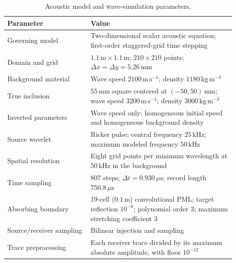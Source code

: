 \documentclass{article}
\begin{document}
\begin{table}[!htbp]
  \centering
  \small
  \caption{Acoustic model and wave-simulation parameters.}
  \label{tab:acoustic-parameters}
  \begin{tabular}{@{}L{0.34\linewidth}L{0.59\linewidth}@{}}
    \toprule
    Parameter & Value \\
    \midrule
    Governing model & Two-dimensional scalar acoustic equation; first-order staggered-grid time stepping \\
    Domain and grid & $1.1\,\mathrm{m}\times1.1\,\mathrm{m}$; $210\times210$ points; $\Delta x=\Delta y=5.26\,\mathrm{mm}$ \\
    Background material & Wave speed $2100\,\mathrm{m\,s^{-1}}$; density $1180\,\mathrm{kg\,m^{-3}}$ \\
    True inclusion & $55\,\mathrm{mm}$ square centered at $(-50,50)\,\mathrm{mm}$; wave speed $3200\,\mathrm{m\,s^{-1}}$; density $3000\,\mathrm{kg\,m^{-3}}$ \\
    Inverted parameters & Wave speed only; homogeneous initial speed and homogeneous background density \\
    Source wavelet & Ricker pulse; central frequency $25\,\mathrm{kHz}$; maximum modeled frequency $50\,\mathrm{kHz}$ \\
    Spatial resolution & Eight grid points per minimum wavelength at $50\,\mathrm{kHz}$ in the background \\
    Time sampling & 807 steps; $\Delta t=0.930\,\mu\mathrm{s}$; record length $750.8\,\mu\mathrm{s}$ \\
    Absorbing boundary & 19-cell ($0.1\,\mathrm{m}$) convolutional PML; target reflection $10^{-6}$; polynomial order 3; maximum stretching coefficient 3 \\
    Source/receiver sampling & Bilinear injection and sampling \\
    Trace preprocessing & Each receiver trace divided by its maximum absolute amplitude, with floor $10^{-12}$ \\
    \bottomrule
  \end{tabular}
\end{table}
\end{document}
